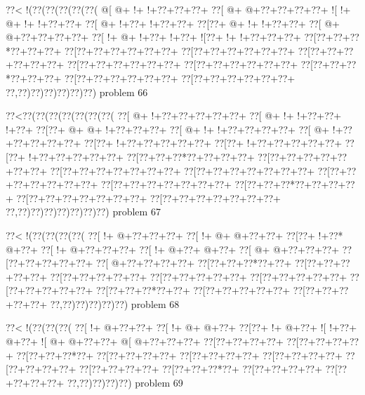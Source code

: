 \vbox{\vbox{\goo
\0??<\- !(\0??(\0??(\0??(\0??(\0??(
\- @[\- @+\- !+\- !+\0??+\0??+\0??+
\0??[\- @+\- @+\0??+\0??+\0??+\0??+
\- ![\- !+\- @+\- !+\- !+\0??+\0??+
\0??[\- @+\- !+\0??+\- !+\0??+\0??+
\0??[\0??+\- @+\- !+\- !+\0??+\0??+
\0??[\- @+\- @+\0??+\0??+\0??+\0??+
\0??[\- !+\- @+\- !+\0??+\- !+\0??+
\- ![\0??+\- !+\- !+\0??+\0??+\0??+
\0??[\0??+\0??+\0??*\0??+\0??+\0??+
\0??[\0??+\0??+\0??+\0??+\0??+\0??+
\0??[\0??+\0??+\0??+\0??+\0??+\0??+
\0??[\0??+\0??+\0??+\0??+\0??+\0??+
\0??[\0??+\0??+\0??+\0??+\0??+\0??+
\0??[\0??+\0??+\0??+\0??+\0??+\0??+
\0??[\0??+\0??+\0??*\0??+\0??+\0??+
\0??[\0??+\0??+\0??+\0??+\0??+\0??+
\0??[\0??+\0??+\0??+\0??+\0??+\0??+
\0??,\0??)\0??)\0??)\0??)\0??)\0??)
}
\hfil problem 66\hfil\break
}

\vbox{\vbox{\goo
\0??<\0??(\0??(\0??(\0??(\0??(\0??(\0??(
\0??[\- @+\- !+\0??+\0??+\0??+\0??+\0??+
\0??[\- @+\- !+\- !+\0??+\0??+\- !+\0??+
\0??[\0??+\- @+\- @+\- !+\0??+\0??+\0??+
\0??[\- @+\- !+\- !+\0??+\0??+\0??+\0??+
\0??[\- @+\- !+\0??+\0??+\0??+\0??+\0??+
\0??[\0??+\- !+\0??+\0??+\0??+\0??+\0??+
\0??[\0??+\- !+\0??+\0??+\0??+\0??+\0??+
\0??[\0??+\- !+\0??+\0??+\0??+\0??+\0??+
\0??[\0??+\0??+\0??*\0??+\0??+\0??+\0??+
\0??[\0??+\0??+\0??+\0??+\0??+\0??+\0??+
\0??[\0??+\0??+\0??+\0??+\0??+\0??+\0??+
\0??[\0??+\0??+\0??+\0??+\0??+\0??+\0??+
\0??[\0??+\0??+\0??+\0??+\0??+\0??+\0??+
\0??[\0??+\0??+\0??+\0??+\0??+\0??+\0??+
\0??[\0??+\0??+\0??*\0??+\0??+\0??+\0??+
\0??[\0??+\0??+\0??+\0??+\0??+\0??+\0??+
\0??[\0??+\0??+\0??+\0??+\0??+\0??+\0??+
\0??,\0??)\0??)\0??)\0??)\0??)\0??)\0??)
}
\hfil problem 67\hfil\break
}

\vbox{\vbox{\goo
\0??<\- !(\0??(\0??(\0??(\0??(
\0??[\- !+\- @+\0??+\0??+\0??+
\0??[\- !+\- @+\- @+\0??+\0??+
\0??[\0??+\- !+\0??*\- @+\0??+
\0??[\- !+\- @+\0??+\0??+\0??+
\0??[\- !+\- @+\0??+\- @+\0??+
\0??[\- @+\- @+\0??+\0??+\0??+
\0??[\0??+\0??+\0??+\0??+\0??+
\0??[\- @+\0??+\0??+\0??+\0??+
\0??[\0??+\0??+\0??*\0??+\0??+
\0??[\0??+\0??+\0??+\0??+\0??+
\0??[\0??+\0??+\0??+\0??+\0??+
\0??[\0??+\0??+\0??+\0??+\0??+
\0??[\0??+\0??+\0??+\0??+\0??+
\0??[\0??+\0??+\0??+\0??+\0??+
\0??[\0??+\0??+\0??*\0??+\0??+
\0??[\0??+\0??+\0??+\0??+\0??+
\0??[\0??+\0??+\0??+\0??+\0??+
\0??,\0??)\0??)\0??)\0??)\0??)
}
\hfil problem 68\hfil\break
}

\vbox{\vbox{\goo
\0??<\- !(\0??(\0??(\0??(
\0??[\- !+\- @+\0??+\0??+
\0??[\- !+\- @+\- @+\0??+
\0??[\0??+\- !+\- @+\0??+
\- ![\- !+\0??+\- @+\0??+
\- ![\- @+\- @+\0??+\0??+
\- @[\- @+\0??+\0??+\0??+
\0??[\0??+\0??+\0??+\0??+
\0??[\0??+\0??+\0??+\0??+
\0??[\0??+\0??+\0??*\0??+
\0??[\0??+\0??+\0??+\0??+
\0??[\0??+\0??+\0??+\0??+
\0??[\0??+\0??+\0??+\0??+
\0??[\0??+\0??+\0??+\0??+
\0??[\0??+\0??+\0??+\0??+
\0??[\0??+\0??+\0??*\0??+
\0??[\0??+\0??+\0??+\0??+
\0??[\0??+\0??+\0??+\0??+
\0??,\0??)\0??)\0??)\0??)
}
\hfil problem 69\hfil\break
}

